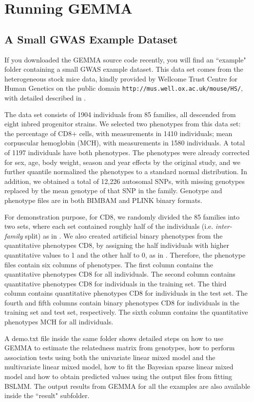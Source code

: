 \documentclass[11pt]{article}
\providecommand{\url}[1]{\texttt{#1}}
\begin{document}
\section{Running GEMMA}

\subsection{A Small GWAS Example Dataset}
If you downloaded the GEMMA source code recently, you will find an ``example" folder containing a small GWAS example dataset. This data set comes from the heterogeneous stock mice data, kindly provided by Wellcome Trust Centre for Human Genetics on the public domain \url{http://mus.well.ox.ac.uk/mouse/HS/}, with detailed described in \cite{Valdar:2006}. 

The data set consists of 1904 individuals from 85 families, all descended from eight inbred progenitor strains. We selected two phenotypes from this data set: the percentage of CD8+ cells, with measurements in 1410 individuals; mean corpuscular hemoglobin (MCH), with measurements in 1580 individuals. A total of 1197 individuals have both phenotypes. The phenotypes were already corrected for sex, age, body weight, season and year effects by the original study, and we further quantile normalized the phenotypes to a standard normal distribution. In addition, we obtained a total of 12,226 autosomal SNPs, with missing genotypes replaced by the mean genotype of that SNP in the family. Genotype and phenotype files are in both BIMBAM and PLINK binary formats. 

For demonstration purpose, for CD8, we randomly divided the 85 families into two sets, where each set contained roughly half of the individuals (i.e. {\it inter-family} split) as in \cite{Zhou:2013}. We also created artificial binary phenotypes from the quantitative phenotypes CD8, by assigning the half individuals with higher quantitative values to 1 and the other half to 0, as in \cite{Zhou:2013}. Therefore, the phenotype files contain six columns of phenotypes. The first column contains the quantitative phenotypes CD8 for all individuals. The second column contains quantitative phenotypes CD8 for individuals in the training set. The third column contains quantitative phenotypes CD8 for individuals in the test set. The fourth and fifth columns contain binary phenotypes CD8 for individuals in the training set and test set, respectively. The sixth column contains the quantitative phenotypes MCH for all individuals.

A demo.txt file inside the same folder shows detailed steps on how to use GEMMA to estimate the relatedness matrix from genotypes, how to perform association tests using both the univariate linear mixed model and the multivariate linear mixed model, how to fit the Bayesian sparse linear mixed model and how to obtain predicted values using the output files from fitting BSLMM. The output results from GEMMA for all the examples are also available inside the ``result" subfolder. 
\end{document}
